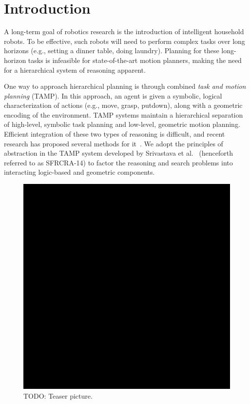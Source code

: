 \section{Introduction}
A long-term goal of robotics research is the introduction of
intelligent household robots.  To be effective, such robots will need
to perform complex tasks over long horizons (e.g., setting a dinner
table, doing laundry). Planning for these long-horizon tasks is
infeasible for state-of-the-art motion planners, making the need for a
hierarchical system of reasoning apparent.

One way to approach hierarchical planning is through combined
\emph{task and motion planning} (TAMP). In this approach, an agent is
given a symbolic, logical characterization of actions (e.g., move,
grasp, putdown), along with a geometric encoding of the
environment. TAMP systems maintain a hierarchical separation of
high-level, symbolic task planning and low-level, geometric motion
planning.  Efficient integration of these two types of reasoning is
difficult, and recent research has proposed several methods for
it~\cite{srivastava2014combined, kaelbling2011hierarchical,
  lagriffoul2014orientation, GarrettWAFR14, dornhege2012semantic}.
We adopt the principles of abstraction in the TAMP system developed by
Srivastava et al.~\cite{srivastava2014combined} (henceforth referred
to as SFRCRA-14) to factor the reasoning and search problems into
interacting logic-based and geometric components.

\begin{figure}[t]
  \centering
    \noindent
    \includegraphics[scale=0.15]{images/black.jpg}
  \caption{\small{TODO: Teaser picture.}}
  \label{fig:cover}
\end{figure}

